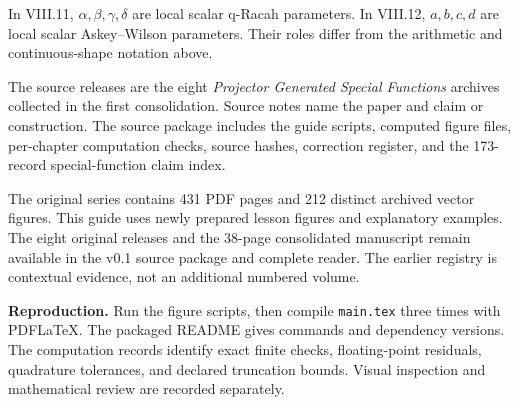 \documentclass[11pt]{article}
\begin{document}
\vspace{0.1in}
In VIII.11, $\alpha,\beta,\gamma,\delta$ are local scalar q-Racah parameters. In VIII.12, $a,b,c,d$ are local scalar Askey--Wilson parameters. Their roles differ from the arithmetic and continuous-shape notation above.

\vspace{0.1in}
The source releases are the eight \emph{Projector Generated Special Functions} archives collected in the first consolidation. Source notes name the paper and claim or construction. The source package includes the guide scripts, computed figure files, per-chapter computation checks, source hashes, correction register, and the 173-record special-function claim index.

The original series contains 431 PDF pages and 212 distinct archived vector figures. This guide uses newly prepared lesson figures and explanatory examples. The eight original releases and the 38-page consolidated manuscript remain available in the v0.1 source package and complete reader. The earlier registry is contextual evidence, not an additional numbered volume.

\textbf{Reproduction.} Run the figure scripts, then compile \texttt{main.tex} three times with PDFLaTeX. The packaged README gives commands and dependency versions. The computation records identify exact finite checks, floating-point residuals, quadrature tolerances, and declared truncation bounds. Visual inspection and mathematical review are recorded separately.
\end{document}
